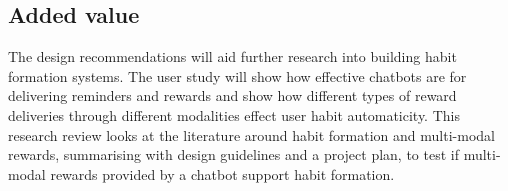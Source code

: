 \subsection*{Added value}
The design recommendations will aid further research into building habit formation systems. The user study will show how effective chatbots are for delivering reminders and rewards and show how different types of reward deliveries through different modalities effect user habit automaticity.\newline
\newline
This research review looks at the literature around habit formation and multi-modal rewards, summarising with design guidelines and a project plan, to test if multi-modal rewards provided by a chatbot support habit formation.

\newpage

